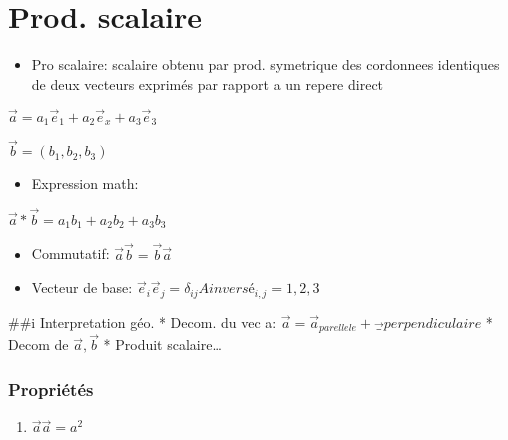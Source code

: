 \documentclass[]{article}
\title{}
\author{}
\date{}
\providecommand{\tightlist}{%
  \setlength{\itemsep}{0pt}\setlength{\parskip}{0pt}}
\begin{document}
\hypertarget{prod.-scalaire}{%
\section{Prod. scalaire}\label{prod.-scalaire}}

\begin{itemize}
\tightlist
\item
  Pro scalaire: scalaire obtenu par prod. symetrique des cordonnees
  identiques de deux vecteurs exprimés par rapport a un repere direct
\end{itemize}

\(\vec{a} = a_1\vec{e}_1+a_2\vec{e}_x+a_3\vec{e}_3\)

\(\vec{b} = (b_1,b_2,b_3)\)

\begin{itemize}
\tightlist
\item
  Expression math:
\end{itemize}

\(\vec{a} * \vec{b} = a_1b_1+a_2b_2+a_3b_3\)

\begin{itemize}
\tightlist
\item
  Commutatif: \(\vec{a} \vec{b} = \vec{b} \vec{a}\)
\item
  Vecteur de base:
  \(\vec{e}_i\vec{e}_j = \delta_{ij} Ainversé_{i,j}=1,2,3\)
\end{itemize}

\#\#i Interpretation géo. * Decom. du vec a:
\(\vec{a} = \vec{a}_{parellele} + \vec_{perpendiculaire}\) * Decom de
\(\vec{a},\vec{b}\) * Produit scalaire\ldots{}

\hypertarget{proprietes}{%
\subsubsection{Propriétés}\label{proprietes}}

\begin{enumerate}
\def\labelenumi{\arabic{enumi}.}
\tightlist
\item
  \(\vec{a}\vec{a} = a^2\)
\end{enumerate}
\end{document}
